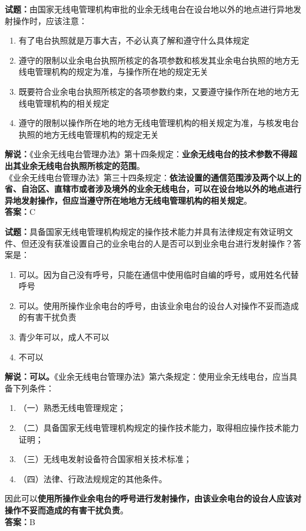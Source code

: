\documentclass{ctexbook}
\begin{document}
\noindent\textbf{试题：}由国家无线电管理机构审批的业余无线电台在设台地以外的地点进行异地发射操作时，应该注意：
\begin{enumerate}[leftmargin=3em]
  \item 有了电台执照就是万事大吉，不必认真了解和遵守什么具体规定
  \item 遵守的限制以业余电台执照所核定的各项参数和核发其业余电台执照的地方无线电管理机构的规定为准，与操作所在地的规定无关
  \item 既要符合业余电台执照所核定的各项参数约束，又要遵守操作所在地的地方无线电管理机构的相关规定
  \item 遵守的限制以操作所在地的地方无线电管理机构的相关规定为准，与核发电台执照的地方无线电管理机构的规定无关
\end{enumerate}
\noindent\textbf{解说：}《业余无线电台管理办法》第十四条规定：\textbf{业余无线电台的技术参数不得超出其业余无线电台执照所核定的范围}。\\
《业余无线电台管理办法》第三十四条规定：\textbf{依法设置的通信范围涉及两个以上的省、自治区、直辖市或者涉及境外的业余无线电台，可以在设台地以外的地点进行异地发射操作，但应当遵守所在地地方无线电管理机构的相关规定}。\\\noindent\textbf{答案：}C


\bigskip

\noindent\textbf{试题：}具备国家无线电管理机构规定的操作技术能力并具有法律规定有效证明文件、但还没有获准设置自己的业余电台的人是否可以到业余电台进行发射操作？答案是：
\begin{enumerate}[leftmargin=3em]
  \item 可以。因为自己没有呼号，只能在通信中使用临时自编的呼号，或用姓名代替呼号
  \item 可以。使用所操作业余电台的呼号，由该业余电台的设台人对操作不妥而造成的有害干扰负责
  \item 青少年可以，成人不可以
  \item 不可以
\end{enumerate}
\noindent\textbf{解说：可以。}《业余无线电台管理办法》第六条规定：使用业余无线电台，应当具备下列条件：
\begin{enumerate}[label=, leftmargin=1em]
  \item （一）熟悉无线电管理规定；
  \item （二）具备国家无线电管理机构规定的操作技术能力，取得相应操作技术能力证明；
  \item （三）无线电发射设备符合国家相关技术标准；
  \item （四）法律、行政法规规定的其他条件。
\end{enumerate}
因此可以\textbf{使用所操作业余电台的呼号进行发射操作，由该业余电台的设台人应该对操作不妥而造成的有害干扰负责}。\\\noindent\textbf{答案：}B
\end{document}

